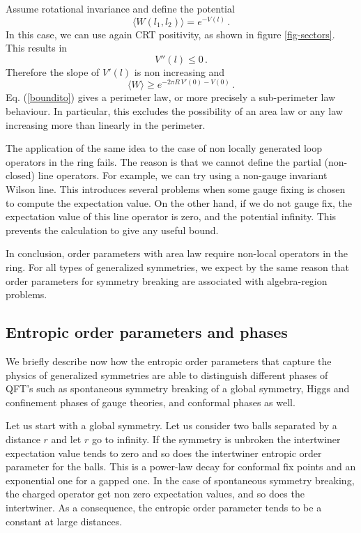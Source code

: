 \documentclass[11pt]{article}
\numberwithin{equation}{section}
\newcommand{\be}{\begin{equation}}
\newcommand{\ee}{\end{equation}}
\begin{document}
Assume rotational invariance and define the potential
\be
\langle W(l_1,l_2)\rangle =e^{-V(l)}\,.\label{hh}
\ee
 In this case, we can use again CRT positivity, as shown in figure \ref{fig-sectors}. This results in
\be 
 V''(l)\le 0\,.
\ee   
Therefore the slope of $V'(l)$ is non increasing and
\be
\langle W \rangle \ge e^{-2 \pi R \,V'(0)-V(0)} \,. \label{boundito}
\ee
 Eq. (\ref{boundito}) gives a perimeter law, or more precisely a sub-perimeter law behaviour. In particular, this excludes the possibility of an area law or any law increasing more than linearly in the perimeter.   

The application of the same idea to the case of non locally generated loop operators in the ring fails. The reason is that we cannot define the partial (non-closed) line operators. For example, we can try using a non-gauge invariant Wilson line.  This introduces several problems when some gauge fixing is chosen to compute the expectation value. On the other hand, if we do not gauge fix, the expectation value of this line operator is zero, and the potential infinity. This prevents the calculation to give any useful bound.   

In conclusion, order parameters with area law require non-local operators in the ring. For all types of generalized symmetries, we expect by the same reason that order parameters for symmetry breaking are associated with algebra-region problems.  





\subsection{Entropic order parameters and phases}

We briefly describe now how the entropic order parameters that capture the physics of generalized symmetries are able to distinguish different phases of QFT's such as spontaneous symmetry breaking of a global symmetry, Higgs and confinement phases of gauge theories, and conformal phases as well. 


Let us start with a global symmetry. Let us consider two balls separated by a distance $r$ and let $r$ go to infinity. If the symmetry is unbroken the intertwiner expectation value tends to zero and so does the intertwiner entropic order parameter for the balls. This is a power-law decay for conformal fix points and an exponential one for a gapped one. 
In the case of spontaneous symmetry breaking, the charged operator get non zero expectation values, and so does the intertwiner.  As a consequence, the entropic order parameter tends to be a constant at large distances.
\end{document}
